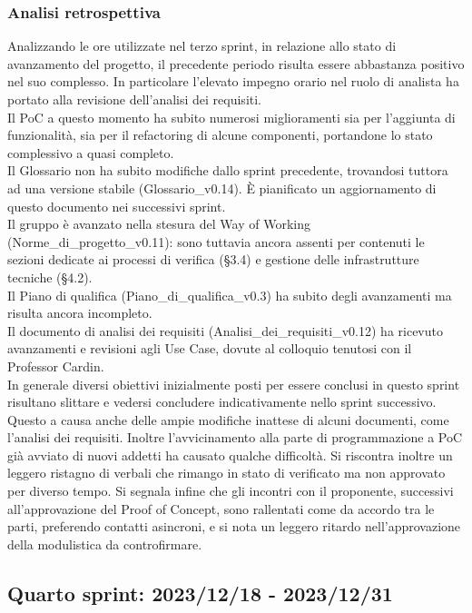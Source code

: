 \newpage
\subsubsection{Analisi retrospettiva}
Analizzando le ore utilizzate nel terzo sprint, in relazione allo stato di avanzamento del progetto, il precedente periodo risulta essere abbastanza positivo nel suo complesso. In particolare l'elevato impegno orario nel ruolo di analista ha portato alla revisione dell'analisi dei requisiti.\\ Il PoC a questo momento ha subito numerosi miglioramenti sia per l'aggiunta di funzionalità, sia per il refactoring di alcune componenti, portandone lo stato complessivo a quasi completo.\\ Il Glossario non ha subito modifiche dallo sprint precedente, trovandosi tuttora ad una versione stabile (Glossario\_v0.14). È pianificato un aggiornamento di questo documento nei successivi sprint.\\ Il gruppo è avanzato nella stesura del Way of Working (Norme\_di\_progetto\_v0.11): sono tuttavia ancora assenti per contenuti le sezioni dedicate ai processi di verifica (§3.4) e gestione delle infrastrutture tecniche (§4.2).\\ Il Piano di qualifica (Piano\_di\_qualifica\_v0.3) ha subito degli avanzamenti ma risulta ancora incompleto.\\ Il documento di analisi dei requisiti (Analisi\_dei\_requisiti\_v0.12) ha ricevuto avanzamenti e revisioni agli Use Case, dovute al colloquio tenutosi con il Professor Cardin.\\ In generale diversi obiettivi inizialmente posti per essere conclusi in questo sprint risultano slittare e vedersi concludere indicativamente nello sprint successivo. Questo a causa anche delle ampie modifiche inattese di alcuni documenti, come l’analisi dei requisiti. Inoltre l’avvicinamento alla parte di programmazione a PoC già avviato di nuovi addetti ha causato qualche difficoltà. Si riscontra inoltre un leggero ristagno di verbali che rimango in stato di verificato ma non approvato per diverso tempo. Si segnala infine che gli incontri con il proponente, successivi all'approvazione del Proof of Concept, sono rallentati come da accordo tra le parti, preferendo contatti asincroni, e si nota un leggero ritardo nell'approvazione della modulistica da controfirmare.
\newpage


\subsection{Quarto sprint: 2023/12/18 - 2023/12/31}

